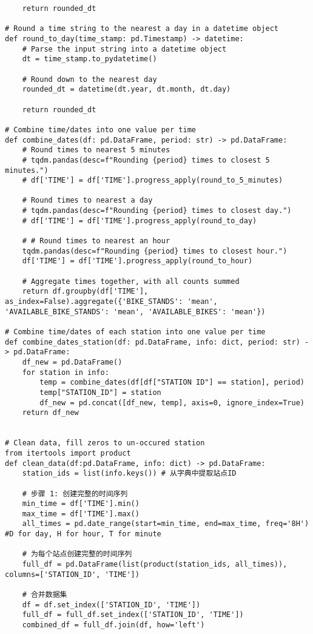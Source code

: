 \begin{lstlisting}
    return rounded_dt
    
# Round a time string to the nearest a day in a datetime object
def round_to_day(time_stamp: pd.Timestamp) -> datetime:
    # Parse the input string into a datetime object
    dt = time_stamp.to_pydatetime()

    # Round down to the nearest day
    rounded_dt = datetime(dt.year, dt.month, dt.day)

    return rounded_dt
    
# Combine time/dates into one value per time
def combine_dates(df: pd.DataFrame, period: str) -> pd.DataFrame:
    # Round times to nearest 5 minutes
    # tqdm.pandas(desc=f"Rounding {period} times to closest 5 minutes.")
    # df['TIME'] = df['TIME'].progress_apply(round_to_5_minutes)

    # Round times to nearest a day
    # tqdm.pandas(desc=f"Rounding {period} times to closest day.")
    # df['TIME'] = df['TIME'].progress_apply(round_to_day)

    # # Round times to nearest an hour
    tqdm.pandas(desc=f"Rounding {period} times to closest hour.")
    df['TIME'] = df['TIME'].progress_apply(round_to_hour)

    # Aggregate times together, with all counts summed
    return df.groupby(df['TIME'], as_index=False).aggregate({'BIKE_STANDS': 'mean', 'AVAILABLE_BIKE_STANDS': 'mean', 'AVAILABLE_BIKES': 'mean'})

# Combine time/dates of each station into one value per time
def combine_dates_station(df: pd.DataFrame, info: dict, period: str) -> pd.DataFrame:
    df_new = pd.DataFrame()
    for station in info:
        temp = combine_dates(df[df["STATION ID"] == station], period)
        temp["STATION_ID"] = station
        df_new = pd.concat([df_new, temp], axis=0, ignore_index=True)
    return df_new


# Clean data, fill zeros to un-occured station
from itertools import product
def clean_data(df:pd.DataFrame, info: dict) -> pd.DataFrame:
    station_ids = list(info.keys()) # 从字典中提取站点ID

    # 步骤 1: 创建完整的时间序列
    min_time = df['TIME'].min()
    max_time = df['TIME'].max()
    all_times = pd.date_range(start=min_time, end=max_time, freq='8H') #D for day, H for hour, T for minute

    # 为每个站点创建完整的时间序列
    full_df = pd.DataFrame(list(product(station_ids, all_times)), columns=['STATION_ID', 'TIME'])

    # 合并数据集
    df = df.set_index(['STATION_ID', 'TIME'])
    full_df = full_df.set_index(['STATION_ID', 'TIME'])
    combined_df = full_df.join(df, how='left')


\end{lstlisting}
